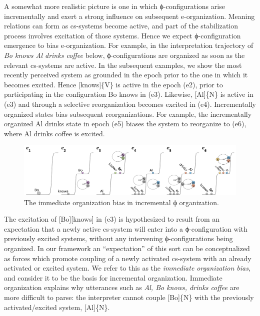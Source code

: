   A somewhat more realistic picture is one in which ϕ-configurations arise incrementally and exert a strong influence on subsequent e-organization. Meaning relations can form as cs-systems become active, and part of the stabilization process involves excitation of those systems. Hence we expect ϕ-configuration emergence to bias e-organization. For example, in the interpretation trajectory of \textit{Bo knows Al drinks coffee} below, ϕ-configurations are organized as soon as the relevant cs-systems are active. In the subsequent examples, we show the most recently perceived system as grounded in the epoch prior to the one in which it becomes excited.  Hence [knows]\{V\} is active in the epoch (e2), prior to participating in the configuration {\textbar}Bo knows{\textbar} in (e3). Likewise, [Al]\{N\} is active in (e3) and through a selective reorganization becomes excited in (e4). Incrementally organized states bias subsequent reorganizations. For example, the incrementally organized {\textbar}Al drinks{\textbar} state in epoch (e5) biases the system to reorganize to (e6), where {\textbar}Al drinks coffee{\textbar} is excited. 

  
\begin{figure}
\includegraphics[width=\textwidth]{figures/Tilsen-img129.png}
\caption{The immediate organization bias in incremental ϕ organization.}
\label{fig:6:10}
\end{figure}
 

  The excitation of [Bo][knows] in (e3) is hypothesized to result from an expectation that a newly active cs-system will enter into a ϕ-configuration with previously excited systems, without any intervening ϕ-configurations being organized. In our framework an “expectation” of this sort can be conceptualized as forces which promote coupling of a newly activated cs-system with an already activated or excited system. We refer to this as the \textit{immediate organization bias}, and consider it to be the basis for incremental organization. Immediate organization explains why utterances such as \textit{Al, Bo knows, drinks coffee} are more difficult to parse: the interpreter cannot couple [Bo]\{N\} with the previously activated/excited system, [Al]\{N\}.

